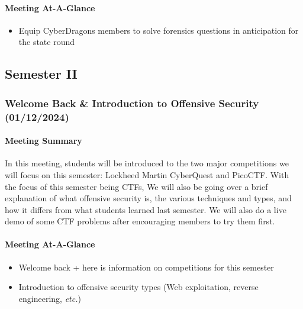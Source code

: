 \documentclass[
  letterpaper,
  DIV=11,
  numbers=noendperiod]{scrartcl}
\let\oldparagraph\paragraph
\renewcommand{\paragraph}[1]{\oldparagraph{#1}\mbox{}}
\providecommand{\tightlist}{%
  \setlength{\itemsep}{0pt}\setlength{\parskip}{0pt}}\usepackage{longtable,booktabs,array}
\begin{document}
\hypertarget{meeting-at-a-glance-10}{%
\paragraph{Meeting At-A-Glance}\label{meeting-at-a-glance-10}}

\begin{itemize}
\tightlist
\item
  Equip CyberDragons members to solve forensics questions in
  anticipation for the state round
\end{itemize}

\hypertarget{semester-ii}{%
\subsection{Semester II}\label{semester-ii}}

\hypertarget{welcome-back-introduction-to-offensive-security-01122024}{%
\subsubsection{Welcome Back \& Introduction to Offensive Security
(01/12/2024)}\label{welcome-back-introduction-to-offensive-security-01122024}}

\hypertarget{meeting-summary-11}{%
\paragraph{Meeting Summary}\label{meeting-summary-11}}

In this meeting, students will be introduced to the two major
competitions we will focus on this semester: Lockheed Martin CyberQuest
and PicoCTF. With the focus of this semester being CTFs, We will also be
going over a brief explanation of what offensive security is, the
various techniques and types, and how it differs from what students
learned last semester. We will also do a live demo of some CTF problems
after encouraging members to try them first.

\hypertarget{meeting-at-a-glance-11}{%
\paragraph{Meeting At-A-Glance}\label{meeting-at-a-glance-11}}

\begin{itemize}
\tightlist
\item
  Welcome back + here is information on competitions for this semester
\item
  Introduction to offensive security types (Web exploitation, reverse
  engineering, \emph{etc.})
\end{itemize}
\end{document}
